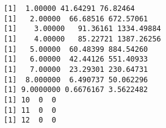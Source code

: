 \documentclass[11pt]{article}
\begin{document}
    \begin{Verbatim}[commandchars=\\\{\}]
[1]  1.00000 41.64291 76.82464
[1]   2.00000  66.68516 672.57061
[1]    3.00000   91.36161 1334.49884
[1]    4.00000   85.22721 1387.26256
[1]   5.00000  60.48399 884.54260
[1]   6.00000  42.44126 551.40933
[1]   7.00000  23.29301 230.64731
[1]  8.000000  6.490737 50.062296
[1] 9.0000000 0.6676167 3.5622482
[1] 10  0  0
[1] 11  0  0
[1] 12  0  0

    \end{Verbatim}

    \begin{center}
    \end{center}
    { \hspace*{\fill} \\}
    
    \begin{center}
    \end{center}
    { \hspace*{\fill} \\}
    
    \begin{center}
    \end{center}
    { \hspace*{\fill} \\}
    
    \begin{center}
    \end{center}
    { \hspace*{\fill} \\}
    
    \begin{center}
    \end{center}
    { \hspace*{\fill} \\}
    
    \begin{center}
    \end{center}
    { \hspace*{\fill} \\}
    
\end{document}
